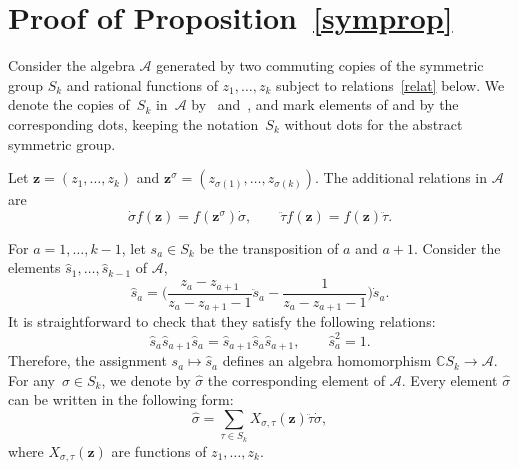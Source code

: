 \documentclass[pdftex]{sigma}
\numberwithin{equation}{section}
\begin{document}
\section{Proof of Proposition~\ref{symprop}}
\label{section6}
Consider the algebra $\mathcal{A}$ generated by two commuting copies of the symmetric group $S_k$ and rational functions of $z_1,\dots,z_k$ subject to relations~\eqref{relat} below. We denote the copies of~$S_k$ in~$\mathcal{A}$ by~ and~, and mark elements of  and  by the corresponding dots, keeping the notation~$S_k$ without dots for the abstract symmetric group.

Let $\boldsymbol{z}=(z_1,\dots,z_k)$ and $\boldsymbol{z}^\sigma=(z_{\sigma(1)},\dots,z_{\sigma(k)})$. The additional relations in $\mathcal{A}$ are
\begin{equation}\label{relat}
\dot\sigma f(\boldsymbol{z})=f(\boldsymbol{z}^\sigma) \dot\sigma,\qquad \ddot\tau f(\boldsymbol{z})=f(\boldsymbol{z}) \ddot \tau.
\end{equation}

For $a=1,\dots,k-1$, let $s_a\in S_k$ be the transposition of $a$ and $a+1$. Consider the elements $\hat{s}_1,\dots,\hat{s}_{k-1}$ of $\mathcal{A}$,
\begin{equation}\label{shat}
\hat{s}_a=\biggl(\frac{z_a-z_{a+1}}{z_a-z_{a+1}-1}\ddot s_a-\frac{1}{z_a-z_{a+1}-1}\biggr)\dot s_a.
\end{equation}
It is straightforward to check that they satisfy the following relations:
\begin{equation*}
\hat{s}_a\hat{s}_{a+1}\hat{s}_a=\hat{s}_{a+1}\hat{s}_a\hat{s}_{a+1},\qquad \hat{s}_a^2=1.
\end{equation*}
Therefore, the assignment $s_a\mapsto \hat{s}_a$ defines an algebra homomorphism $\mathbb{C}S_k\rightarrow \mathcal{A}$. For any~${\sigma\in S_k}$, we denote by $\hat{\sigma}$ the corresponding element of $ \mathcal{A}$. Every element $\hat{\sigma}$ can be written in the following form:
\begin{equation}\label{sighat}
\hat{\sigma}=\sum_{\tau\in S_k} X_{\sigma,\tau}(\boldsymbol{z}) \ddot \tau \dot \sigma,
\end{equation}
where $X_{\sigma,\tau}(\boldsymbol{z})$ are functions of $z_1,\dots,z_k$.
\end{document}
